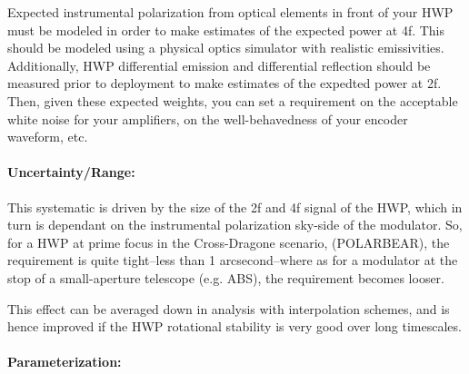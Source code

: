 Expected instrumental polarization from optical elements in front of your HWP must be modeled in order to make estimates of the expected power at 4f. This should be modeled using a physical optics simulator with realistic emissivities. Additionally, HWP differential emission and differential reflection should be measured prior to deployment to make estimates of the expedted power at 2f. Then, given these expected weights, you can set a requirement on the acceptable white noise for your amplifiers, on the well-behavedness of your encoder waveform, etc.

\paragraph{Uncertainty/Range:}

This systematic is driven by the size of the 2f and 4f signal of the HWP, which in turn is dependant on the instrumental polarization sky-side of the modulator. So, for a HWP at prime focus in the Cross-Dragone scenario, (POLARBEAR), the requirement is quite tight--less than 1 arcsecond--where as for a modulator at the stop of a small-aperture telescope (e.g. ABS), the requirement becomes looser.

This effect can be averaged down in analysis with interpolation schemes, and is hence improved if the HWP rotational stability is very good over long timescales.

\paragraph{Parameterization:}
